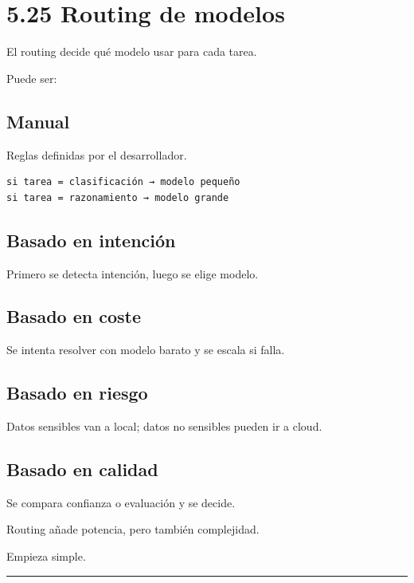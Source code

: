 \section{5.25 Routing de modelos}\label{routing-de-modelos}

El routing decide qué modelo usar para cada tarea.

Puede ser:

\subsection{Manual}\label{manual}

Reglas definidas por el desarrollador.

\begin{lstlisting}
si tarea = clasificación → modelo pequeño
si tarea = razonamiento → modelo grande
\end{lstlisting}

\subsection{Basado en intención}\label{basado-en-intenciuxf3n}

Primero se detecta intención, luego se elige modelo.

\subsection{Basado en coste}\label{basado-en-coste}

Se intenta resolver con modelo barato y se escala si falla.

\subsection{Basado en riesgo}\label{basado-en-riesgo}

Datos sensibles van a local; datos no sensibles pueden ir a cloud.

\subsection{Basado en calidad}\label{basado-en-calidad}

Se compara confianza o evaluación y se decide.

Routing añade potencia, pero también complejidad.

Empieza simple.

\begin{center}\rule{0.5\linewidth}{0.5pt}\end{center}

